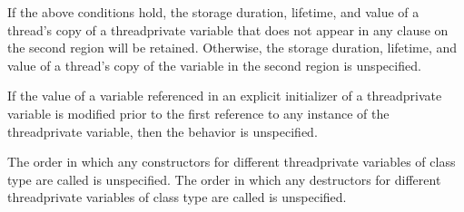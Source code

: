 \begin{ccppspecific}
If the above conditions hold, the storage duration, lifetime, and value of a thread's copy
of a threadprivate variable that does not appear in any  clause on the second
region will be retained. Otherwise, the storage duration, lifetime, and value of a thread's
copy of the variable in the second region is unspecified.

If the value of a variable referenced in an explicit initializer of a threadprivate variable
is modified prior to the first reference to any instance of the threadprivate variable, then
the behavior is unspecified.
\end{ccppspecific}
%
\begin{cppspecific}
The order in which any constructors for different threadprivate variables of class type
are called is unspecified. The order in which any destructors for different threadprivate
variables of class type are called is unspecified.
\end{cppspecific}
%
